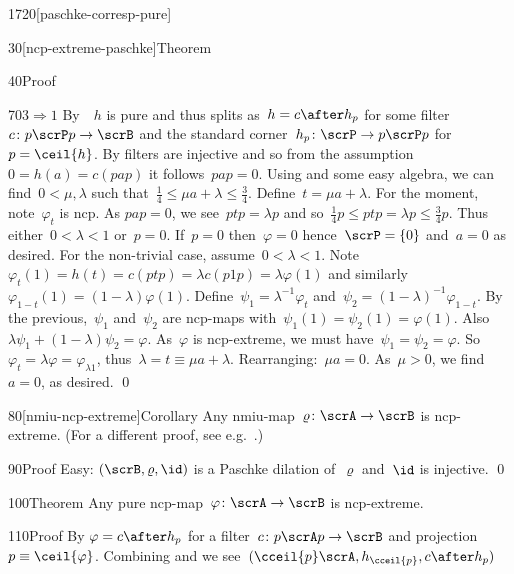 \begin{parsec}{1720}[paschke-corresp-pure]
\begin{point}{30}[ncp-extreme-paschke]{Theorem}
\begin{point}{40}{Proof}
\begin{point}{70}{$3 \Rightarrow 1$}
By~~$h$ is pure
    and thus splits as~$h = c \after h_p$
    for some filter~$c \colon p\scrP p \to \scrB$
    and the standard corner~$h_p\colon \scrP \to p\scrP p$
    for~$p = \ceil{h}$.
By  filters are injective
    and so from the assumption~$0 = h(a) = c(pap)$
    it follows~$pap = 0$.
Using  and some easy algebra,
    we can find~$0 < \mu,\lambda$
    such that~$\frac{1}{4} \leq \mu a + \lambda \leq \frac{3}{4}$.
Define~$t = \mu a + \lambda$.
For the moment, note~$\varphi_t$ is ncp.
As $pap = 0$, we see~$ptp = \lambda p$ and
so~$\frac{1}{4} p \leq  ptp = \lambda p
    \leq \frac{3}{4} p$.
Thus either~$0 < \lambda < 1$ or~$p = 0$.
If~$p = 0$ then~$\varphi=0$ hence~$\scrP = \{0\}$
    and~$a = 0$ as desired.
For the non-trivial case, assume~$0 < \lambda <1$.
Note~$\varphi_t(1) = h(t) = c(ptp) = \lambda c(p1p) = \lambda \varphi(1)$
    and similarly~$\varphi_{1-t}(1) = (1-\lambda) \varphi(1)$.
Define~$\psi_1 = \lambda^{-1} \varphi_t$
and~$\psi_2 = (1-\lambda)^{-1}\varphi_{1-t}$.
By the previous,~$\psi_1$ and~$\psi_2$ are ncp-maps
    with~$\psi_1(1)=\psi_2(1)=\varphi(1)$.
    Also~$\lambda \psi_1 + (1-\lambda) \psi_2 = \varphi$.
As~$\varphi$ is ncp-extreme,
    we must have~$\psi_1 = \psi_2 = \varphi$.
So~$\varphi_t = \lambda \varphi = \varphi_{\lambda 1}$,
    thus~$\lambda = t \equiv \mu a + \lambda$.
    Rearranging:~$\mu a = 0$.
    As~$\mu > 0$, we find~$a=0$, as desired. \qed
\end{point}
\end{point}
\end{point}
\begin{point}{80}[nmiu-ncp-extreme]{Corollary}%
Any nmiu-map~$\varrho\colon \scrA \to \scrB$ is ncp-extreme.
    (For a different proof, see e.g.~\cite[thm.~3.5]{stormer1963positive}.)
\begin{point}{90}{Proof}%
Easy: $(\scrB, \varrho, \id)$ is a Paschke dilation of~$\varrho$
and~$\id$ is injective.  \qed
\end{point}
\end{point}
\begin{point}{100}{Theorem}%
Any pure ncp-map~$\varphi\colon \scrA \to \scrB$ is ncp-extreme.
\begin{point}{110}{Proof}%
By  $\varphi = c \after h_p$
    for a filter~$c\colon p\scrA p \to \scrB$
    and projection~$p \equiv \ceil{\varphi}$.
    Combining  and 
    we see~$(\cceil{p}\scrA, h_{\cceil{p}}, c\after h_p)$

\end{point}
\end{point}
\end{parsec}
